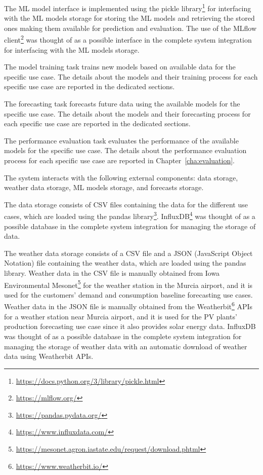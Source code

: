 The ML model interface is implemented using the pickle library\footnote{ \url{https://docs.python.org/3/library/pickle.html} } for interfacing with the ML models storage for storing the ML models and retrieving the stored ones making them available for prediction and evaluation.
The use of the MLflow client\footnote{ \url{https://mlflow.org/} } was thought of as a possible interface in the complete system integration for interfacing with the ML models storage.

The model training task trains new models based on available data for the specific use case.
The details about the models and their training process for each specific use case are reported in the dedicated sections.

The forecasting task forecasts future data using the available models for the specific use case.
The details about the models and their forecasting process for each specific use case are reported in the dedicated sections.

The performance evaluation task evaluates the performance of the available models for the specific use case.
The details about the performance evaluation process for each specific use case are reported in Chapter~\ref{cha:evaluation}.

The system interacts with the following external components: data storage, weather data storage, ML models storage, and forecasts storage.

The data storage consists of CSV files containing the data for the different use cases, which are loaded using the pandas library\footnote{ \url{https://pandas.pydata.org/} }.
InfluxDB\footnote{ \url{https://www.influxdata.com/} } was thought of as a possible database in the complete system integration for managing the storage of data.

The weather data storage consists of a CSV file and a JSON (JavaScript Object Notation) file containing the weather data, which are loaded using the pandas library.
Weather data in the CSV file is manually obtained from Iowa Environmental Mesonet\footnote{ \url{https://mesonet.agron.iastate.edu/request/download.phtml} } for the weather station in the Murcia airport, and it is used for the customers’ demand and consumption baseline forecasting use cases.
Weather data in the JSON file is manually obtained from the Weatherbit\footnote{ \url{https://www.weatherbit.io/} } APIs for a weather station near Murcia airport, and it is used for the PV plants' production forecasting use case since it also provides solar energy data.
InfluxDB was thought of as a possible database in the complete system integration for managing the storage of weather data with an automatic download of weather data using Weatherbit APIs.

